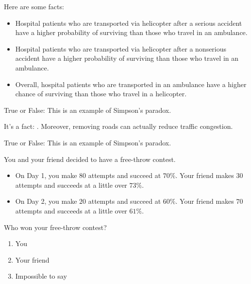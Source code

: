 \documentclass[nooutcomes,noauthor]{ximera}
\author{Bart Snapp}
\begin{document}
\maketitle



\begin{exercise}
  Here are some facts:
  \begin{itemize}
      \item Hospital patients who are transported via helicopter
        after a serious accident have a higher probability of
        surviving than those who travel in an ambulance.
      \item Hospital patients who are transported via helicopter
        after a nonserious accident have a higher probability of
        surviving than those who travel in an ambulance.
      \item Overall, hospital patients who are transported in an
        ambulance have a higher chance of surviving than those who travel in a helicopter.
  \end{itemize}
        
  
  True or False: This is an example of Simpson's paradox.
 
\end{exercise}




\begin{exercise}
  It's a fact: . Moreover,
  removing roads can actually reduce traffic congestion.

  
  True or False: This is an example of Simpson's paradox.

\end{exercise}

\begin{exercise}
  You and your friend decided to have a free-throw contest.
  \begin{itemize}
  \item On Day 1, you make $80$ attempts and succeed at $70\%$. Your
    friend makes $30$ attempts and succeeds at a little over $73\%$.
  \item On Day 2, you make $20$ attempts and succeed at $60\%$. Your friend makes $70$ attempts and succeeds at a little over $61\%$.
  \end{itemize}
  Who won your free-throw contest?
  \begin{enumerate}
  \item You
  \item Your friend
  \item Impossible to say
  \end{enumerate}

\end{exercise}
\end{document}
